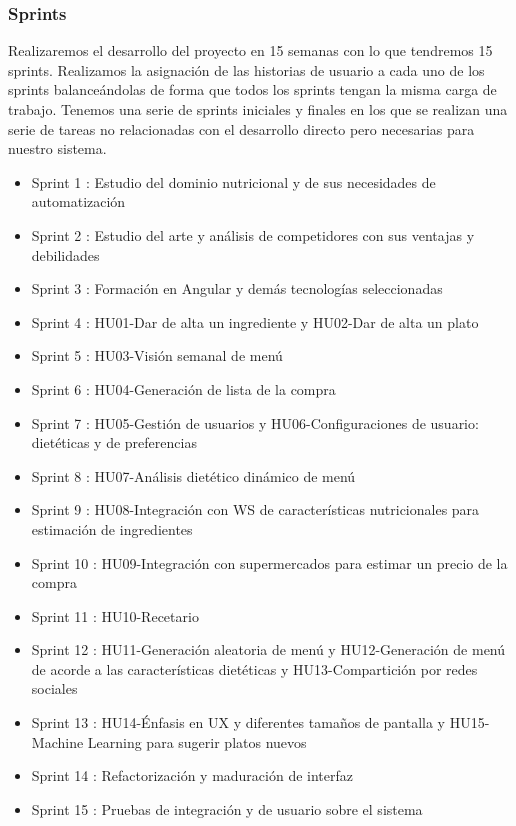 \documentclass[12pt, a4paper, twoside]{book}
\begin{document}
	\subsubsection{Sprints}
	Realizaremos el desarrollo del proyecto en 15 semanas con lo que tendremos 15 sprints. Realizamos la asignación de las historias de usuario a cada uno de los sprints balanceándolas de forma que todos los sprints tengan la misma carga de trabajo. Tenemos una serie de sprints iniciales y finales en los que se realizan una serie de tareas no relacionadas con el desarrollo directo pero necesarias para nuestro sistema.
	\begin{itemize}
		\item Sprint 1 : Estudio del dominio nutricional y de sus necesidades de automatización
		\item Sprint 2 : Estudio del arte y análisis de competidores con sus ventajas y debilidades
		\item Sprint 3 : Formación en Angular y demás tecnologías seleccionadas
		\item Sprint 4 : HU01-Dar de alta un ingrediente y HU02-Dar de alta un plato
		\item Sprint 5 : HU03-Visión semanal de menú
		\item Sprint 6 : HU04-Generación de lista de la compra
		\item Sprint 7 : HU05-Gestión de usuarios y HU06-Configuraciones de usuario: dietéticas y de preferencias
		\item Sprint 8 : HU07-Análisis dietético dinámico de menú
		\item Sprint 9 : HU08-Integración con WS de características nutricionales para estimación de ingredientes
		\item Sprint 10 : HU09-Integración con supermercados para estimar un precio de la compra
		\item Sprint 11 : HU10-Recetario
		\item Sprint 12 : HU11-Generación aleatoria de menú y HU12-Generación de menú de acorde a las características dietéticas y HU13-Compartición por redes sociales
		\item Sprint 13 : HU14-Énfasis en UX y diferentes tamaños de pantalla y HU15-Machine Learning para sugerir platos nuevos
		\item Sprint 14 : Refactorización y maduración de interfaz
		\item Sprint 15 : Pruebas de integración y de usuario sobre el sistema 
	\end{itemize}
	
\end{document}
